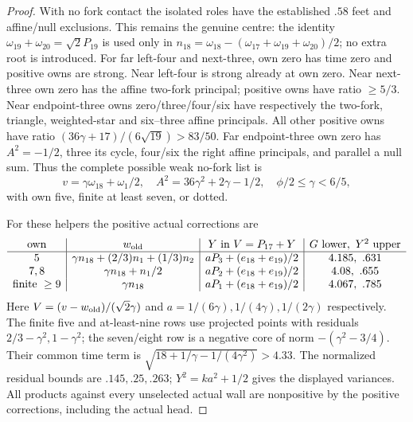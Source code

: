 \begin{proof}
With no fork contact the isolated roles have the established
$.58$ feet and affine/null exclusions. This remains the genuine
centre: the identity
$\omega_{19}+\omega_{20}=\sqrt2P_{19}$ is used only in
$n_{18}=\omega_{18}-(\omega_{17}+\omega_{19}+\omega_{20})/2$;
no extra root is introduced. For far left-four and next-three,
own zero has time zero and positive owns are strong.
Near left-four is strong already at own zero. Near next-three
own zero has the affine two-fork principal; positive owns have
ratio $\ge5/3$. Near endpoint-three owns zero/three/four/six
have respectively the two-fork, triangle, weighted-star and
six--three affine principals. All other positive owns have
ratio $(36\gamma+17)/(6\sqrt{19})>83/50$.
Far endpoint-three own zero has $A^2=-1/2$, three its cycle,
four/six the right affine principals, and parallel a null sum.
Thus the complete possible weak no-fork list is
\[
 v=\gamma\omega_{18}+\omega_1/2,\quad
 A^2=36\gamma^2+2\gamma-1/2,
 \quad \phi/2\le\gamma<6/5,
\]
with own five, finite at least seven, or dotted.

For these helpers the positive actual corrections are
\[
\begin{array}{c|c|c|c}
\text{own}&w_{\rm old}&Y\text{ in }V=P_{17}+Y&G\text{ lower},\ Y^2\text{ upper}\\\hline
5&\gamma n_{18}+(2/3)n_1+(1/3)n_2&aP_3+(e_{18}+e_{19})/2&4.185,\ .631\\
7,8&\gamma n_{18}+n_1/2&aP_2+(e_{18}+e_{19})/2&4.08,\ .655\\
\text{finite }\ge9&\gamma n_{18}&aP_1+(e_{18}+e_{19})/2&4.067,\ .785
\end{array}
\]
Here $V=(v-w_{\rm old})/(\sqrt2\gamma)$ and
$a=1/(6\gamma),1/(4\gamma),1/(2\gamma)$ respectively.
The finite five and at-least-nine rows use projected points
with residuals $2/3-\gamma^2,1-\gamma^2$; the seven/eight
row is a negative core of norm $-(\gamma^2-3/4)$.
Their common time term is
$\sqrt{18+1/\gamma-1/(4\gamma^2)}>4.33$.
The normalized residual bounds are $.145,.25,.263$;
$Y^2=ka^2+1/2$ gives the displayed variances.
All products against every unselected actual wall are nonpositive
by the positive corrections, including the actual head.


\end{proof}
